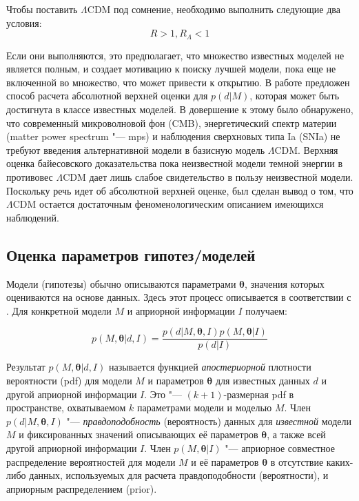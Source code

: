 Чтобы поставить $\Lambda$CDM под сомнение, необходимо выполнить следующие два условия:
\begin{equation}
R > 1, R_\Lambda < 1
\end{equation}

Если они выполняются, это предполагает, что множество известных моделей не является полным, и создает мотивацию к 
поиску лучшей модели, пока еще не включенной во множество, что может привести к открытию. В работе 
\cite{starkman2008introducing} предложен способ расчета абсолютной верхней оценки для $p(d|M)$, которая может быть 
достигнута в классе известных моделей. В довершение к этому было обнаружено, что современный микроволновой фон (CMB), 
энергетический спектр материи (matter power spectrum "--- mps) и наблюдения сверхновых типа Ia (SNIa) не требуют 
введения альтернативной модели в базисную модель $\Lambda$CDM. Верхняя оценка байесовского доказательства пока 
неизвестной модели темной энергии в противовес $\Lambda$CDM дает лишь слабое свидетельство в пользу неизвестной модели. 
Поскольку речь идет об абсолютной верхней оценке, был сделан вывод о том, что $\Lambda$CDM остается достаточным 
феноменологическим описанием имеющихся наблюдений.

\subsection{Оценка параметров гипотез/моделей} \label{sect1_2_4}
Модели (гипотезы) обычно описываются параметрами $\boldsymbol{\theta}$, значения которых оцениваются на основе данных. 
Здесь этот процесс описывается в соответствии с \cite{ivezic2019statistics}. Для конкретной модели $M$ и априорной 
информации $I$ получаем:

\begin{equation}
    p(M, \boldsymbol{\theta}|d, I) = \frac{p(d|M, \boldsymbol{\theta}, I) p(M, \boldsymbol{\theta} |I)}{p(d|I)}
\end{equation}

Результат $p(M, \boldsymbol{\theta}|d, I)$ называется функцией \textit{апостериорной} плотности вероятности (pdf) 
для модели $M$ и параметров $\boldsymbol{\theta}$ для известных данных $d$ и другой априорной информации $I$. 
Это "--- $(k + 1)$-размерная pdf в пространстве, охватываемом $k$ параметрами модели и моделью $M$. Член 
$p(d|M, \boldsymbol{\theta}, I)$ "--- \textit{правдоподобность} (вероятность) данных для \textit{известной} 
модели $M$ и фиксированных значений описывающих её параметров $\boldsymbol{\theta}$, а также всей другой 
априорной информации $I$. Член $p(M, \boldsymbol{\theta}|I)$ "--- априорное совместное распределение вероятностей 
для модели $M$ и её параметров $\boldsymbol{\theta}$ в отсутствие каких-либо данных, используемых для расчета 
правдоподобности (вероятности), и априорным распределением (prior).

